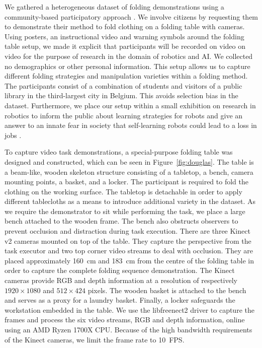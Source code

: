 \documentclass[\home/main.tex]{subfiles}
\begin{document}
We gathered a heterogeneous dataset of folding demonstrations using a community-based participatory approach \autocite{English2018}. We involve citizens by requesting them to demonstrate their method to fold clothing on a folding table with cameras. Using posters, an instructional video and warning symbols around the folding table setup, we made it explicit that participants will be recorded on video on video for the purpose of research in the domain of robotics and AI. We collected no demographics or other personal information. This setup allows us to capture different folding strategies and manipulation varieties within a folding method. The participants consist of a combination of students and visitors of a public library in the third-largest city in Belgium. This avoids selection bias in the dataset. Furthermore, we place our setup within a small exhibition on research in robotics to inform the public about learning strategies for robots and give an answer to an innate fear in society that self-learning robots could lead to a loss in jobs \autocite{Fleming2019}. \par

To capture video task demonstrations, a special-purpose folding table was designed and constructed, which can be seen in Figure~\ref{fig:douglas}. The table is a beam-like, wooden skeleton structure consisting of a tabletop, a bench, camera mounting points, a basket, and a locker. The participant is required to fold the clothing on the working surface. The tabletop is detachable in order to apply different tablecloths as a means to introduce additional variety in the dataset. As we require the demonstrator to sit while performing the task, we place a large bench attached to the wooden frame. The bench also obstructs observers to prevent occlusion and distraction during task execution. There are three Kinect v2 cameras mounted on top of the table. They capture the perspective from the task executor and two top corner video streams to deal with occlusion. They are placed approximately \qty{160}{\cm} and \qty{183}{\cm} from the centre of the folding table in order to capture the complete folding sequence demonstration. The Kinect cameras provide RGB and depth information at a resolution of respectively $1920\times1080$ and $512\times424$ pixels. The wooden basket is attached to the bench and serves as a proxy for a laundry basket. Finally, a locker safeguards the workstation embedded in the table. We use the libfreenect2 driver \autocite{Xiang2016} to capture the frames and process the six video streams, RGB and depth information, online using an AMD Ryzen 1700X CPU. Because of the high bandwidth requirements of the Kinect cameras, we limit the frame rate to \qty{10}{FPS}. \par
\end{document}
